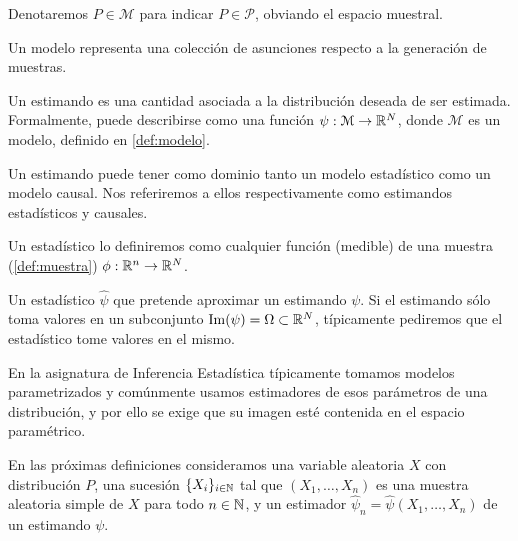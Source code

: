 \begin{notac}
    Denotaremos $P \in \mathcal{M}$ para indicar $P \in \mathcal{P}$, obviando el espacio muestral.
\end{notac}

\begin{observacion}
    Un modelo representa una colección de asunciones respecto a la generación de muestras.
\end{observacion}


\begin{definicion}[Estimando]
    Un estimando es una cantidad asociada a la distribución deseada de ser estimada.
    Formalmente, puede describirse como una función $\psi: \mathcal{M} \to \mathbb{R}^N$, donde $\mathcal{M}$ es un
    modelo, definido en \ref{def:modelo}.
\end{definicion}

\begin{nota}
    Un estimando puede tener como dominio tanto un modelo estadístico como un modelo causal. Nos referiremos a ellos
    respectivamente como estimandos estadísticos y causales.
\end{nota}

\begin{definicion}[Estadístico]
    Un estadístico lo definiremos como cualquier función (medible) de una muestra (\ref{def:muestra}) $\phi: \mathbb{R}^n \to \mathbb{R}^N$.
\end{definicion}

\begin{definicion}[Estimador]
    Un estadístico $\hat\psi$ que pretende aproximar un estimando $\psi$.
    Si el estimando sólo toma valores en un subconjunto $\operatorname{Im}(\psi) = \Omega \subset \mathbb{R}^N$, típicamente pediremos que el estadístico
    tome valores en el mismo.
\end{definicion}

\begin{observacion}
    En la asignatura de Inferencia Estadística típicamente tomamos modelos parametrizados y comúnmente usamos
    estimadores de esos parámetros de una distribución, y por ello se exige
    que su imagen esté contenida en el espacio paramétrico.
\end{observacion}

En las próximas definiciones consideramos una variable aleatoria $X$ con distribución
$P$, una sucesión $\{X_i\}_{i \in \mathbb{N}}$ tal que $(X_1, \ldots, X_n)$ es una muestra
aleatoria simple de $X$ para todo $n \in \mathbb{N}$, y un estimador
$\hat\psi_n = \hat\psi(X_1, \ldots, X_n)$ de un estimando $\psi$.

